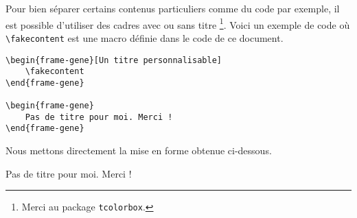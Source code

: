 Pour bien séparer certains contenus particuliers comme du code par exemple, il est possible d'utiliser des cadres avec ou sans titre
\footnote{
    Merci au package \texttt{tcolorbox}.
}.
Voici un exemple de code où \verb+\fakecontent+ est une macro définie dans le code de ce document.

\begin{frame-gene}
\small
\begin{verbatim}
\begin{frame-gene}[Un titre personnalisable]
    \fakecontent
\end{frame-gene}

\begin{frame-gene}
    Pas de titre pour moi. Merci !
\end{frame-gene}
\end{verbatim}
\end{frame-gene}



\medskip

Nous mettons directement la mise en forme obtenue ci-dessous.

\begin{frame-gene}
    \fakecontent
\end{frame-gene}

\begin{frame-gene}
    Pas de titre pour moi. Merci !
\end{frame-gene}
